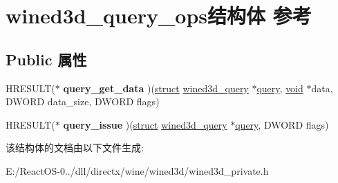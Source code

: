 \hypertarget{structwined3d__query__ops}{}\section{wined3d\+\_\+query\+\_\+ops结构体 参考}
\label{structwined3d__query__ops}
\subsection*{Public 属性}
\begin{DoxyCompactItemize}
\item 
\mbox{\label{structwined3d__query__ops_abcdfea4d1db2bca812494ab173094c8b}} 
H\+R\+E\+S\+U\+LT($\ast$ {\bfseries query\+\_\+get\+\_\+data} )(\hyperlink{interfacestruct}{struct} \hyperlink{structwined3d__query}{wined3d\+\_\+query} $\ast$\hyperlink{structquery}{query}, \hyperlink{interfacevoid}{void} $\ast$data, D\+W\+O\+RD data\+\_\+size, D\+W\+O\+RD flags)
\item 
\mbox{\label{structwined3d__query__ops_ad4b3185ada11ed972ae27a288c158b86}} 
H\+R\+E\+S\+U\+LT($\ast$ {\bfseries query\+\_\+issue} )(\hyperlink{interfacestruct}{struct} \hyperlink{structwined3d__query}{wined3d\+\_\+query} $\ast$\hyperlink{structquery}{query}, D\+W\+O\+RD flags)
\end{DoxyCompactItemize}


该结构体的文档由以下文件生成\+:\begin{DoxyCompactItemize}
\item 
E\+:/\+React\+O\+S-\/0../dll/directx/wine/wined3d/wined3d\+\_\+private.\+h\end{DoxyCompactItemize}
